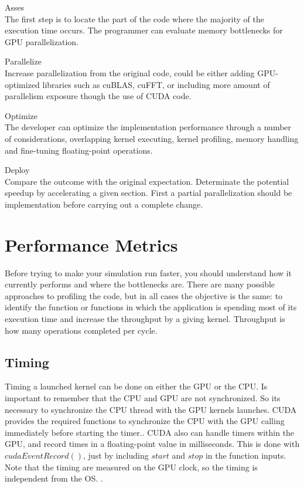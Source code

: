 \begin{description}

 \item{Asses} \hfill \\
 The first step is to locate the part of the code where the majority of the execution time occurs. The programmer can evaluate memory bottlenecks for GPU parallelization.
 \item{Parallelize} \hfill \\
 Increase parallelization from the original code, could be either adding GPU-optimized libraries such as cuBLAS, cuFFT, or including more amount of parallelism exposure though the use of CUDA code.
 \item{Optimize} \hfill \\
The developer can optimize the implementation performance through a number of considerations, overlapping kernel executing, kernel profiling, memory handling and fine-tuning floating-point operations.
 \item{Deploy} \hfill \\
 Compare the outcome with the original expectation. Determinate the potential speedup by accelerating a given section. First a partial parallelization should be implementation before carrying out a complete change.
 \end{description}


\section{Performance Metrics}

Before trying to make your simulation run faster, you should understand how it currently performs and where the bottlenecks are. There are many possible approaches to profiling the code, but in all cases the objective is the same: to identify the function or functions in which the application is spending most of its execution time and increase the throughput by a giving kernel. Throughput is how many operations completed per cycle.

\subsection{Timing}

Timing a launched kernel can be done on either the GPU or the CPU. Is important to remember that the CPU and GPU are not synchronized. So its necessary to synchronize the CPU thread with the GPU kernels launches. CUDA provides the required  functions to synchronize the CPU with the GPU calling immediately before starting the timer.\cite{practices}.  CUDA also can handle timers within the GPU, and record times in a floating-point value in milliseconds. This is done with $cudaEventRecord()$, just by including $start$ and $stop$ in the function inputs. Note that the timing are measured on the GPU clock, so the timing is independent from the OS. \cite{cook}.

